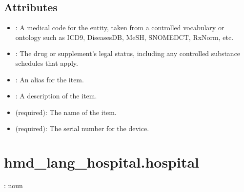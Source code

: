 \documentclass[letterpaper,10pt,english,openany,oneside]{sphinxmanual}
\begin{document}
\subsection{Attributes}
\label{\detokenize{classes/hmd_lang_hospital/device:attributes}}\begin{itemize}
\item {} 
\sphinxAtStartPar
{} : A medical code for the entity, taken from a controlled vocabulary or ontology such as ICD\sphinxhyphen{}9, DiseasesDB, MeSH, SNOMED\sphinxhyphen{}CT, RxNorm, etc.

\item {} 
\sphinxAtStartPar
{} : The drug or supplement’s legal status, including any controlled substance schedules that apply.

\item {} 
\sphinxAtStartPar
{} : An alias for the item.

\item {} 
\sphinxAtStartPar
{} : A description of the item.

\item {} 
\sphinxAtStartPar
{} (required): The name of the item.

\item {} 
\sphinxAtStartPar
{} (required): The serial number for the device.

\end{itemize}

\sphinxstepscope


\section{hmd\_lang\_hospital.hospital}
\label{\detokenize{classes/hmd_lang_hospital/hospital:hmd-lang-hospital-hospital}}\label{\detokenize{classes/hmd_lang_hospital/hospital::doc}}
\sphinxAtStartPar
{}: noun
\end{document}
